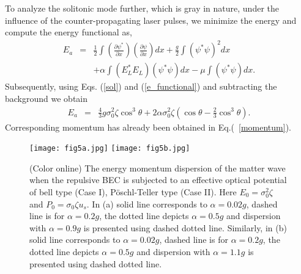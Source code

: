 \documentclass[epj]{svjour}
\begin{document}
To analyze the solitonic mode further, which is gray in nature, under the influence of the counter-propagating laser pulses, we minimize the energy and compute the energy functional as,
\begin{eqnarray}
E_{a}&=&\frac{1}{2}\int\left(\frac{\partial\psi^*}{\partial x}\right)\left(\frac{\partial\psi}{\partial x}\right)dx+\frac{g}{2}\int\left(\psi^*\psi\right)^2dx\nonumber\\&& + \alpha\int\left(E_L^*E_L\right)\left(\psi^*\psi\right)dx-\mu\int\left(\psi^*\psi\right)dx.\label{e_functional}
\end{eqnarray}
Subsequently, using Eqs. (\ref{sol}) and (\ref{e_functional}) and subtracting the background we obtain
\begin{eqnarray}
E_{a}&=&\frac{4}{3}g\sigma_0^2\zeta\cos^3\theta+2\alpha\sigma_0^2\zeta\left(\cos\theta-\frac{2}{3}\cos^3\theta\right).\label{energy}
\end{eqnarray}
Corresponding momentum has already been obtained in Eq.(~\ref{momentum}).
\begin{figure}[h]
\centering
\texttt{[image: fig5a.jpg]}
\texttt{[image: fig5b.jpg]}
\caption{(Color online)  The energy momentum dispersion of the matter wave when the repulsive BEC is subjected to an effective optical potential of bell type (Case I),   P\"{o}schl-Teller type (Case II). Here $E_0=\sigma_0^2\zeta$ and $P_0=\sigma_0\zeta u_s$. In (a) solid line corresponds to $\alpha=0.02g$, dashed line is for $\alpha=0.2g$, the dotted line depicts $\alpha=0.5g$ and dispersion with $\alpha=0.9g$ is presented using dashed dotted line. Similarly, in (b)  solid line corresponds to $\alpha=0.02g$, dashed line is for $\alpha=0.2g$, the dotted line depicts $\alpha=0.5g$ and dispersion with $\alpha=1.1g$ is presented using dashed dotted line.}
\label{dispersion}
\end{figure}
\end{document}
